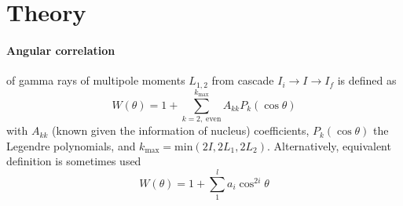 \section{Theory}\label{sec:theory}

\paragraph{Angular correlation} of gamma rays of multipole moments $L_{1,2}$ from \gag cascade $I_i \rightarrow I \rightarrow I_f$ is defined as
\begin{equation}
   W(\theta) = 1 + \sum_{k=2, \; \text{even}}^{k_\text{max}} A_{kk} P_k (\cos \theta)
\end{equation}
with $A_{kk}$ (known given the information of nucleus) coefficients, $P_k (\cos \theta)$ the Legendre polynomials, and $k_\text{max} = \text{min}(2I, 2L_1, 2L_2)$\cite{siegbahn}. Alternatively, equivalent definition is sometimes used~\cite{deutsch}
\begin{equation}
   W(\theta) = 1 + \sum_{1}^{l} a_i \cos^{2i} \theta
\end{equation}

